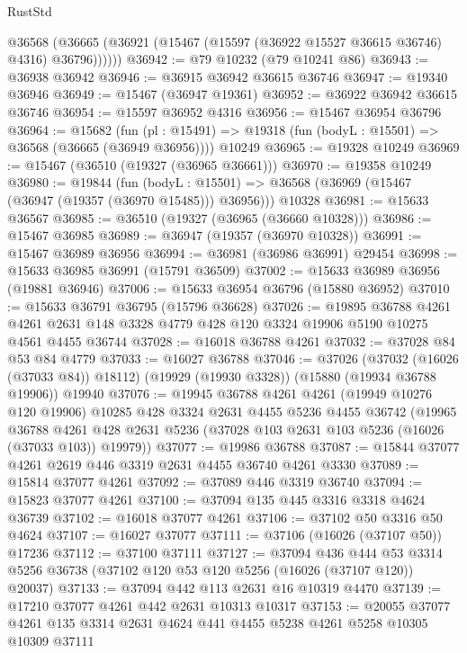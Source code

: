 \begin{lexlean}{RustStd}
\begin{coremodule}
        @36568 (@36665 (@36921 (@15467 (@15597 (@36922 @15527 @36615 @36746) @4316) @36796))))))
@36942 := @79 @10232 (@79 @10241 @86)
@36943 := @36938 @36942
@36946 := @36915 @36942 @36615 @36746
@36947 := @19340 @36946
@36949 := @15467 (@36947 @19361)
@36952 := @36922 @36942 @36615 @36746
@36954 := @15597 @36952 @4316
@36956 := @15467 @36954 @36796
@36964 := @15682
    (fun (pl : @15491) => @19318 (fun (bodyL : @15501) => @36568 (@36665 (@36949 @36956))))
    @10249
@36965 := @19328 @10249
@36969 := @15467 (@36510 (@19327 (@36965 @36661)))
@36970 := @19358 @10249
@36980 := @19844
    (fun (bodyL : @15501) => @36568 (@36969 (@15467 (@36947 (@19357 (@36970 @15485))) @36956)))
    @10328
@36981 := @15633 @36567
@36985 := @36510 (@19327 (@36965 (@36660 @10328)))
@36986 := @15467 @36985
@36989 := @36947 (@19357 (@36970 @10328))
@36991 := @15467 @36989 @36956
@36994 := @36981 (@36986 @36991) @29454
@36998 := @15633 @36985 @36991 (@15791 @36509)
@37002 := @15633 @36989 @36956 (@19881 @36946)
@37006 := @15633 @36954 @36796 (@15880 @36952)
@37010 := @15633 @36791 @36795 (@15796 @36628)
@37026 := @19895
    @36788
    @4261
    @4261
    @2631
    @148
    @3328
    @4779
    @428
    @120
    @3324
    @19906
    @5190
    @10275
    @4561
    @4455
    @36744
@37028 := @16018 @36788 @4261
@37032 := @37028 @84 @53 @84 @4779
@37033 := @16027 @36788
@37046 := @37026
    (@37032 (@16026 (@37033 @84)) @18112)
    (@19929 (@19930 @3328))
    (@15880 (@19934 @36788 @19906))
    @19940
@37076 := @19945
    @36788
    @4261
    @4261
    (@19949 @10276 @120 @19906)
    @10285
    @428
    @3324
    @2631
    @4455
    @5236
    @4455
    @36742
    (@19965
      @36788
      @4261
      @428
      @2631
      @5236
      (@37028 @103 @2631 @103 @5236 (@16026 (@37033 @103)) @19979))
@37077 := @19986 @36788
@37087 := @15844 @37077 @4261 @2619 @446 @3319 @2631 @4455 @36740 @4261 @3330
@37089 := @15814 @37077 @4261
@37092 := @37089 @446 @3319 @36740
@37094 := @15823 @37077 @4261
@37100 := @37094 @135 @445 @3316 @3318 @4624 @36739
@37102 := @16018 @37077 @4261
@37106 := @37102 @50 @3316 @50 @4624
@37107 := @16027 @37077
@37111 := @37106 (@16026 (@37107 @50)) @17236
@37112 := @37100 @37111
@37127 := @37094
    @436
    @444
    @53
    @3314
    @5256
    @36738
    (@37102 @120 @53 @120 @5256 (@16026 (@37107 @120)) @20037)
@37133 := @37094 @442 @113 @2631 @16 @10319 @4470
@37139 := @17210 @37077 @4261 @442 @2631 @10313 @10317
@37153 := @20055
    @37077
    @4261
    @135
    @3314
    @2631
    @4624
    @441
    @4455
    @5238
    @4261
    @5258
    @10305
    @10309
    @37111

\end{coremodule}
\end{lexlean}
